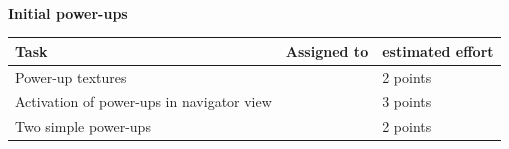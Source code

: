 \documentclass{article}
\begin{document}
\newline \\
\textbf{Initial power-ups} \\
\begin{tabular}{ | l | l | l | }
\hline
\textbf{Task} & \textbf{Assigned to} & \textbf{estimated effort} \\ \hline
Power-up textures &  & 2 points \\ \hline
Activation of power-ups in navigator view & & 3 points \\ \hline
Two simple power-ups  & & 2 points \\ \hline
\end{tabular} \newline
\newline \\
\end{document}
